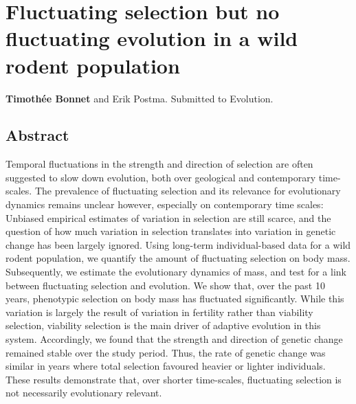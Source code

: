
\chapter[\texorpdfstring{Chapter 5 \\ Fluctuating selection but no fluctuating evolution in a wild rodent population}{Chapter 5 -- Fluctuating selection but no fluctuating evolution in a wild rodent population}]{Fluctuating selection but no fluctuating evolution in a wild rodent population}
\label{chap:flusel}

\textbf{Timoth\'{e}e Bonnet} and Erik Postma. Submitted to Evolution.

\section{Abstract}
Temporal fluctuations in the strength and direction of selection are often suggested to slow down evolution, both over geological and contemporary time-scales. The prevalence of fluctuating selection and its relevance for evolutionary dynamics remains unclear however, especially on contemporary time scales: Unbiased empirical estimates of variation in selection are still scarce, and the question of how much variation in selection translates into variation in genetic change has been largely ignored.
Using long-term individual-based data for a wild rodent population, we quantify the amount of fluctuating selection on body mass. Subsequently, we estimate the evolutionary dynamics of mass, and test for a link between fluctuating selection and evolution. 
We show that, over the past 10 years, phenotypic selection on body mass has fluctuated significantly. While this variation is largely the result of variation in fertility rather than viability selection, viability selection is the main driver of adaptive evolution in this system. Accordingly, we found that the strength and direction of genetic change remained stable over the study period. Thus, the rate of genetic change was similar in years where total selection favoured heavier or lighter individuals.
These results demonstrate that, over shorter time-scales, fluctuating selection is not necessarily evolutionary relevant. 

